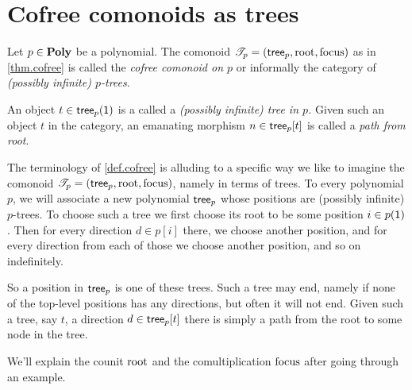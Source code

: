 \documentclass[Book-Poly]{subfiles}
\begin{document}
\section{Cofree comonoids as trees}\label{subsec.cofree_tree}

\begin{definition}\label{def.cofree}
Let $p\in\mathbf{Poly}$ be a polynomial. The comonoid $\mathscr{T}_{p}=(\mathsf{tree}_p,\mathrm{root},\mathrm{focus})$ as in \cref{thm.cofree} is called the \emph{cofree comonoid on $p$} or informally the category of \emph{(possibly infinite) $p$-trees}.

An object $t\in \mathsf{tree}_p(\textsf{1})$ is a called a \emph{(possibly infinite) tree in $p$.} Given such an object $t$ in the category, an emanating morphism $n\in\mathsf{tree}_p[t]$ is called a \emph{path from root}.
\end{definition}

The terminology of \cref{def.cofree} is alluding to a specific way we like to imagine the comonoid $\mathscr{T}_{p}=(\mathsf{tree}_p,\mathrm{root},\mathrm{focus})$, namely in terms of trees. To every polynomial $p$, we will associate a new polynomial $\mathsf{tree}_p$ whose positions are (possibly infinite) $p$-trees. To choose such a tree we first choose its root to be some position $i\in p(\textsf{1})$. Then for every direction $d\in p[i]$ there, we choose another position, and for every direction from each of those we choose another position, and so on indefinitely.

So a position in $\mathsf{tree}_p$ is one of these trees. Such a tree may end, namely if none of the top-level positions has any directions, but often it will not end. Given such a tree, say $t$, a direction $d\in\mathsf{tree}_p[t]$ there is simply a path from the root to some node in the tree. 

We'll explain the counit $\mathrm{root}$ and the comultiplication $\mathrm{focus}$ after going through an example.
\end{document}

